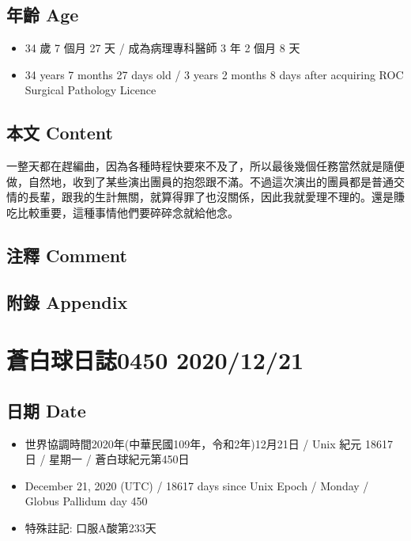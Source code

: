 \documentclass[
]{article}
\providecommand{\tightlist}{%
  \setlength{\itemsep}{0pt}\setlength{\parskip}{0pt}}
\begin{document}
\hypertarget{ux5e74ux9f61-age-19}{%
\subsection{年齡 Age}\label{ux5e74ux9f61-age-19}}

\begin{itemize}
\tightlist
\item
  34 歲 7 個月 27 天 / 成為病理專科醫師 3 年 2 個月 8 天
\item
  34 years 7 months 27 days old / 3 years 2 months 8 days after
  acquiring ROC Surgical Pathology Licence
\end{itemize}

\hypertarget{ux672cux6587-content-19}{%
\subsection{本文 Content}\label{ux672cux6587-content-19}}

一整天都在趕編曲，因為各種時程快要來不及了，所以最後幾個任務當然就是隨便做，自然地，收到了某些演出團員的抱怨跟不滿。不過這次演出的團員都是普通交情的長輩，跟我的生計無關，就算得罪了也沒關係，因此我就愛理不理的。還是賺吃比較重要，這種事情他們要碎碎念就給他念。

\hypertarget{ux6ce8ux91cb-comment-19}{%
\subsection{注釋 Comment}\label{ux6ce8ux91cb-comment-19}}

\hypertarget{ux9644ux9304-appendix-19}{%
\subsection{附錄 Appendix}\label{ux9644ux9304-appendix-19}}

\hypertarget{ux84bcux767dux7403ux65e5ux8a8c0450-20201221}{%
\section{蒼白球日誌0450
2020/12/21}\label{ux84bcux767dux7403ux65e5ux8a8c0450-20201221}}

\hypertarget{ux65e5ux671f-date-20}{%
\subsection{日期 Date}\label{ux65e5ux671f-date-20}}

\begin{itemize}
\tightlist
\item
  世界協調時間2020年(中華民國109年，令和2年)12月21日 / Unix 紀元 18617
  日 / 星期一 / 蒼白球紀元第450日
\item
  December 21, 2020 (UTC) / 18617 days since Unix Epoch / Monday /
  Globus Pallidum day 450
\item
  特殊註記: 口服A酸第233天
\end{itemize}
\end{document}
